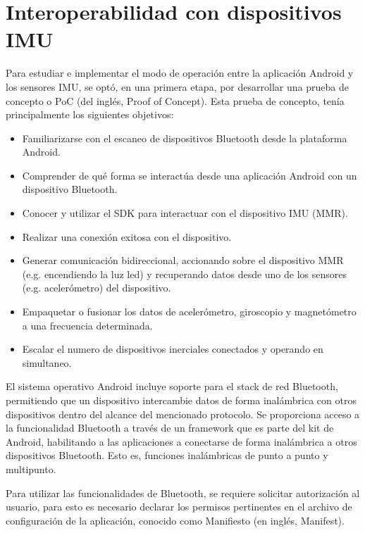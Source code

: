 \section{Interoperabilidad con dispositivos IMU} \label{section:app-imu}

Para estudiar e implementar el modo de operación entre la aplicación Android y los sensores IMU, se optó, en una primera etapa, por desarrollar una prueba de concepto o \gls{PoC} (del inglés, Proof of Concept). Esta prueba de concepto, tenía principalmente los siguientes objetivos: 

\begin{itemize}
    \item Familiarizarse con el escaneo de dispositivos Bluetooth desde la plataforma Android.
    \item Comprender de qué forma se interactúa desde una aplicación Android con un dispositivo Bluetooth.
    \item Conocer y utilizar el SDK para interactuar con el dispositivo IMU (MMR).
    \item Realizar una conexión exitosa con el dispositivo.
    \item Generar comunicación bidireccional, accionando sobre el dispositivo MMR (e.g. encendiendo la luz led) y recuperando datos desde uno de los sensores (e.g. acelerómetro) del dispositivo.
    \item Empaquetar o fusionar los datos de acelerómetro, giroscopio y magnetómetro a una frecuencia determinada.
    \item Escalar el numero de dispositivos inerciales conectados y operando en simultaneo.
\end{itemize}

El sistema operativo Android incluye soporte para el stack de red Bluetooth, permitiendo que un dispositivo intercambie datos de forma inalámbrica con otros dispositivos dentro del alcance del mencionado protocolo. Se proporciona acceso a la funcionalidad Bluetooth a través de un framework que es parte del kit de Android, habilitando a las aplicaciones a conectarse de forma inalámbrica a otros dispositivos Bluetooth. Esto es, funciones inalámbricas de punto a punto y multipunto.

\noindent Para utilizar las funcionalidades de Bluetooth, se requiere solicitar autorización al usuario, para esto es necesario declarar los permisos pertinentes en el archivo de configuración de la aplicación, conocido como Manifiesto (en inglés, Manifest). 

